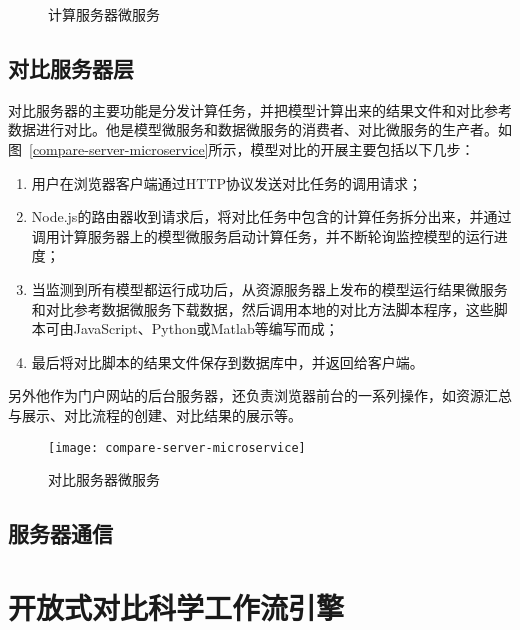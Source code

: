 \begin{figure}[!htbp]
    \centering
    \hfill
    \caption{计算服务器微服务}
    \label{fig:ms-server-microservice}
\end{figure}

\subsection{对比服务器层}
对比服务器的主要功能是分发计算任务，并把模型计算出来的结果文件和对比参考数据进行对比。他是模型微服务和数据微服务的消费者、对比微服务的生产者。如图~\ref{compare-server-microservice}所示，模型对比的开展主要包括以下几步：

\begin{enumerate}[(1)]
\item 用户在浏览器客户端通过HTTP协议发送对比任务的调用请求；
\item Node.js的路由器收到请求后，将对比任务中包含的计算任务拆分出来，并通过调用计算服务器上的模型微服务启动计算任务，并不断轮询监控模型的运行进度；
\item 当监测到所有模型都运行成功后，从资源服务器上发布的模型运行结果微服务和对比参考数据微服务下载数据，然后调用本地的对比方法脚本程序，这些脚本可由JavaScript、Python或Matlab等编写而成；
\item 最后将对比脚本的结果文件保存到数据库中，并返回给客户端。
\end{enumerate}

另外他作为门户网站的后台服务器，还负责浏览器前台的一系列操作，如资源汇总与展示、对比流程的创建、对比结果的展示等。

\begin{figure}[!htbp]
    \centering
    \texttt{[image: compare-server-microservice]}
    \caption{对比服务器微服务}
    \label{fig:compare-server-microservice}
\end{figure}

\subsection{服务器通信}

\section{开放式对比科学工作流引擎}
